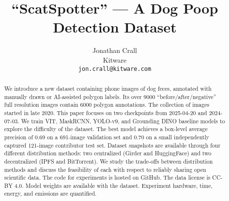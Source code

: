 \documentclass{article}
\title{``ScatSpotter'' --- A Dog Poop Detection Dataset}
\author{Jonathan Crall\\
Kitware\\
\texttt{jon.crall@kitware.com} \\
}
\newif\ifuseappendix
\begin{document}
\maketitle

\begin{abstract}


We introduce a new dataset containing phone images of dog feces, annotated with manually drawn or AI-assisted polygon labels.  Its over 9000 ``before/after/negative'' full resolution images contain 6000 polygon annotations.  The collection of images started in late 2020.  This paper focuses on two checkpoints from 2025-04-20 and 2024-07-03.  We train VIT, MaskRCNN, YOLO-v9, and Grounding DINO baseline models to explore the difficulty of the dataset.  The best model achieves a box-level average precision of 0.69 on a 691-image validation set and 0.70 on a small independently captured 121-image contributor test set.  Dataset snapshots are available through four different distribution methods: two centralized (Girder and HuggingFace) and two decentralized (IPFS and BitTorrent).  We study the trade-offs between distribution methods and discuss the feasibility of each with respect to reliably sharing open scientific data.  The code for experiments is hosted on GitHub.  The data license is CC-BY 4.0.  Model weights are available with the dataset.  Experiment hardware, time, energy, and emissions are quantified.


\end{abstract}





\FloatBarrier



{\small


}


\ifuseappendix

%
\fi
\end{document}
